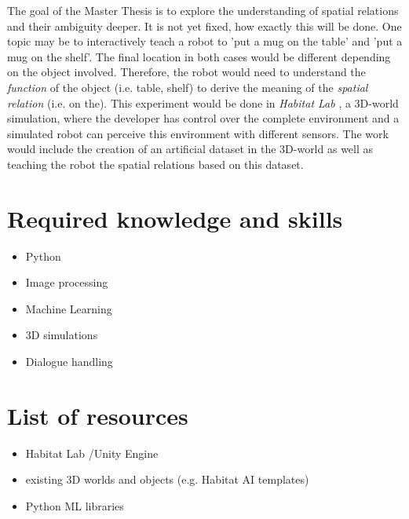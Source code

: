 \documentclass[
	11pt, %
]{fphw}
\begin{document}
The goal of the Master Thesis is to explore the understanding of spatial relations and their ambiguity deeper. It is not yet fixed, how exactly this will be done. One topic may be to interactively teach a robot to 'put a mug on the table' and 'put a mug on the shelf'. The final location in both cases would be different depending on the object involved. Therefore, the robot would need to understand the \emph{function} of the object (i.e. table, shelf) to derive the meaning of the \emph{spatial relation} (i.e. on the). This experiment would be done in \emph{Habitat Lab} \cite{szot2021habitat}, a 3D-world simulation, where the developer has control over the complete environment and a simulated robot can perceive this environment with different sensors. The work would include the creation of an artificial dataset in the 3D-world as well as teaching the robot the spatial relations based on this dataset.


\section*{Required knowledge and skills}
\begin{itemize}
	\item Python
	\item Image processing
	\item Machine Learning
	\item 3D simulations
	\item Dialogue handling
\end{itemize}

\section*{List of resources}
\begin{itemize}
	\item Habitat Lab \cite{szot2021habitat}/Unity Engine
	\item existing 3D worlds and objects (e.g. Habitat AI templates) \cite{szot2021habitat}
	\item Python ML libraries
\end{itemize}
\end{document}
